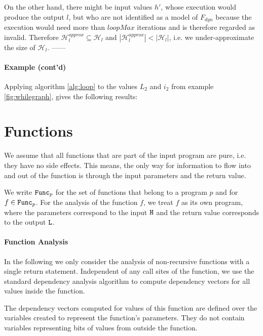 On the other hand, there might be input values $h'$, whose execution would produce the output $l$, but who are not identified as a model of $F_{dyn}$ because the execution would need more than $loopMax$ iterations and is therefore regarded as invalid.
Therefore $\mathcal{H}_l^{approx} \subseteq \mathcal{H}_l$ and $|\mathcal{H}_l^{approx}| < |\mathcal{H}_l|$, i.e. we under-approximate the size of $\mathcal{H}_l$. 
------


\paragraph{Example (cont'd)}
Applying algorithm \ref{alg:loop} to the values $L_2$ and $i_2$ from example \ref{fig:whilegraph}, gives the following results:
\begin{center}
\end{center}

\section{Functions}
We assume that all functions that are part of the input program are pure, i.e. they have no side effects. This means, the only way for information to flow into and out of the function is through the input parameters and the return value.

We write $\mathtt{Func}_p$ for the set of functions that belong to a program $p$ and for $f \in \mathtt{Func}_p$. For the analysis of the function $f$, we treat $f$ as its own program, where the parameters correspond to the input $\mathtt{H}$ and the return value corresponds to the output $\mathtt{L}$.

\paragraph{Function Analysis}
In the following we only consider the analysis of non-recursive functions with a single return statement. Independent of any call sites of the function, we use the standard dependency analysis algorithm to compute dependency vectors for all values inside the function.

The dependency vectors computed for values of this function are defined over the variables created to represent the function's parameters. They do not contain variables representing bits of values from outside the function.


